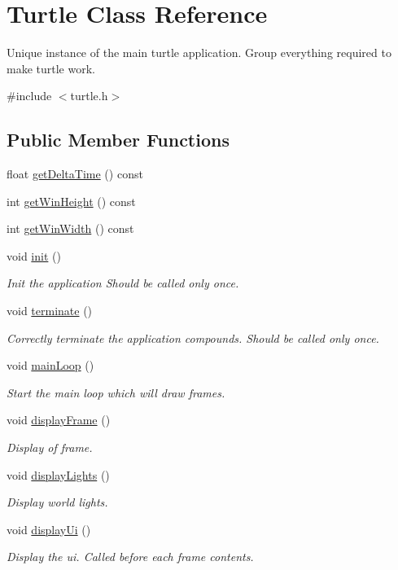 \hypertarget{classTurtle}{}\section{Turtle Class Reference}
\label{classTurtle}


Unique instance of the main turtle application. Group everything required to make turtle work.  




{\ttfamily \#include $<$turtle.\+h$>$}

\subsection*{Public Member Functions}
\begin{DoxyCompactItemize}
\item 
float \hyperlink{classTurtle_a0dcb4f2259a8f54bdd45988c11ead3c7}{get\+Delta\+Time} () const
\item 
int \hyperlink{classTurtle_ac2be48e2f6b5df9581b0b346038771b3}{get\+Win\+Height} () const
\item 
int \hyperlink{classTurtle_a9e8f4f0b3abafac7b89b118bef6fcaa3}{get\+Win\+Width} () const
\item 
void \hyperlink{classTurtle_a3c5a8cc7cc5a16b3ffb2be0c24eda79c}{init} ()
\begin{DoxyCompactList}\small\item\em Init the application Should be called only once. \end{DoxyCompactList}\item 
void \hyperlink{classTurtle_a42152a0f5631a00428477cbffa8476e1}{terminate} ()
\begin{DoxyCompactList}\small\item\em Correctly terminate the application compounds. Should be called only once. \end{DoxyCompactList}\item 
void \hyperlink{classTurtle_a7f687dce15334de9dbc475ce4869b6c8}{main\+Loop} ()
\begin{DoxyCompactList}\small\item\em Start the main loop which will draw frames. \end{DoxyCompactList}\item 
void \hyperlink{classTurtle_a899c4635a6c30fef7723542e7524f606}{display\+Frame} ()
\begin{DoxyCompactList}\small\item\em Display of frame. \end{DoxyCompactList}\item 
void \hyperlink{classTurtle_a88420dd1ecfc2b1b0d391e153013dc8d}{display\+Lights} ()
\begin{DoxyCompactList}\small\item\em Display world lights. \end{DoxyCompactList}\item 
void \hyperlink{classTurtle_a6150d70ce0dc15374d434be05ea0b75e}{display\+Ui} ()
\begin{DoxyCompactList}\small\item\em Display the ui. Called before each frame contents. \end{DoxyCompactList}\end{DoxyCompactItemize}
